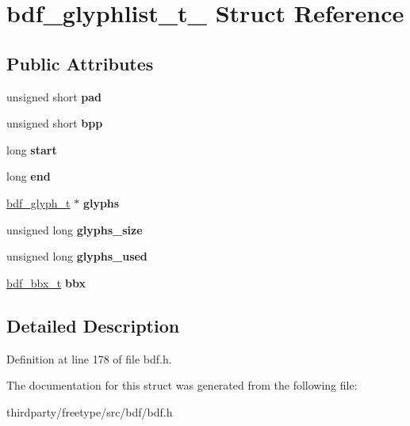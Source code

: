 \hypertarget{structbdf__glyphlist__t__}{}\section{bdf\+\_\+glyphlist\+\_\+t\+\_\+ Struct Reference}
\label{structbdf__glyphlist__t__}
\subsection*{Public Attributes}
\begin{DoxyCompactItemize}
\item 
\mbox{\label{structbdf__glyphlist__t___adc1416f7c677edc25b261252896ad459}} 
unsigned short {\bfseries pad}
\item 
\mbox{\label{structbdf__glyphlist__t___aec7dca633f95197ee238f528ca78b79c}} 
unsigned short {\bfseries bpp}
\item 
\mbox{\label{structbdf__glyphlist__t___a2acd1ba1e1233e3d3dcd80850da2261b}} 
long {\bfseries start}
\item 
\mbox{\label{structbdf__glyphlist__t___a623e0fbab3dc3190d1f5264b34798b75}} 
long {\bfseries end}
\item 
\mbox{\label{structbdf__glyphlist__t___a81fab83de11dc70f150c97ce57af2bcf}} 
\hyperlink{structbdf__glyph__t__}{bdf\+\_\+glyph\+\_\+t} $\ast$ {\bfseries glyphs}
\item 
\mbox{\label{structbdf__glyphlist__t___a0bbd1d4e4624426165c4e1c48207c240}} 
unsigned long {\bfseries glyphs\+\_\+size}
\item 
\mbox{\label{structbdf__glyphlist__t___a882cc81c1df1cd36a57ba7a56d703e65}} 
unsigned long {\bfseries glyphs\+\_\+used}
\item 
\mbox{\label{structbdf__glyphlist__t___ae158c411febe31bedf7140cbfefb9091}} 
\hyperlink{structbdf__bbx__t__}{bdf\+\_\+bbx\+\_\+t} {\bfseries bbx}
\end{DoxyCompactItemize}


\subsection{Detailed Description}


Definition at line 178 of file bdf.\+h.



The documentation for this struct was generated from the following file\+:\begin{DoxyCompactItemize}
\item 
thirdparty/freetype/src/bdf/bdf.\+h\end{DoxyCompactItemize}
